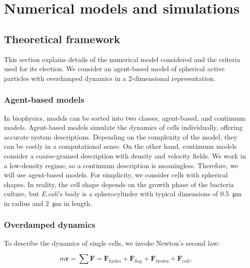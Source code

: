 \chapter{Numerical models and simulations}

\section{Theoretical framework}

This section explains details of the numerical model considered and the criteria used for its election. We consider an agent-based model of spherical active particles with overdamped dynamics in a 2-dimensional representation. 

\subsection{Agent-based models} 

In biophysics, models can be sorted into two classes, agent-based, and continuum models. Agent-based models simulate the dynamics of cells individually, offering accurate system descriptions. Depending on the complexity of the model, they can be costly in a computational sense. On the other hand, continuum models consider a coarse-grained description with density and velocity fields. We work in a low-density regime, so a continuum description is meaningless. Therefore, we will use agent-based models. For simplicity, we consider cells with spherical shapes. In reality, the cell shape depends on the growth phase of the bacteria culture, but \textit{E.coli}'s body is a spherocylinder with typical dimensions of \SI{0.5}{\micro\meter} in radius and \SI{2}{\micro\meter} in length.

\subsection{Overdamped dynamics}

To describe the dynamics of single cells, we invoke Newton's second law: 

\begin{equation}
	m\ddot{\textbf{r}} = \sum \textbf{F} = \textbf{F}_{\text{hydro}} + \textbf{F}_{\text{flag}} + \textbf{F}_{\text{brown}} + \textbf{F}_{\text{coll}} ,
\end{equation}

